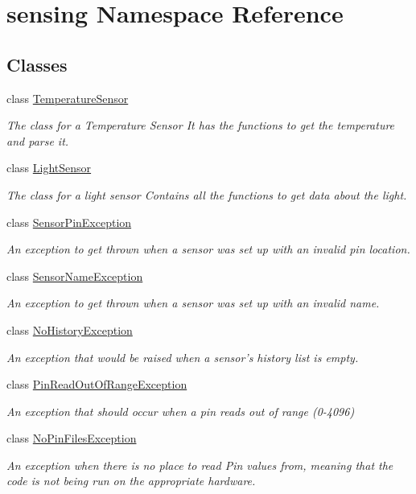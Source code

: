 \hypertarget{namespacesensing}{\section{sensing Namespace Reference}
\label{namespacesensing}
}
\subsection*{Classes}
\begin{DoxyCompactItemize}
\item 
class \hyperlink{classsensing_1_1_temperature_sensor}{Temperature\-Sensor}
\begin{DoxyCompactList}\small\item\em The class for a Temperature Sensor It has the functions to get the temperature and parse it. \end{DoxyCompactList}\item 
class \hyperlink{classsensing_1_1_light_sensor}{Light\-Sensor}
\begin{DoxyCompactList}\small\item\em The class for a light sensor Contains all the functions to get data about the light. \end{DoxyCompactList}\item 
class \hyperlink{classsensing_1_1_sensor_pin_exception}{Sensor\-Pin\-Exception}
\begin{DoxyCompactList}\small\item\em An exception to get thrown when a sensor was set up with an invalid pin location. \end{DoxyCompactList}\item 
class \hyperlink{classsensing_1_1_sensor_name_exception}{Sensor\-Name\-Exception}
\begin{DoxyCompactList}\small\item\em An exception to get thrown when a sensor was set up with an invalid name. \end{DoxyCompactList}\item 
class \hyperlink{classsensing_1_1_no_history_exception}{No\-History\-Exception}
\begin{DoxyCompactList}\small\item\em An exception that would be raised when a sensor's history list is empty. \end{DoxyCompactList}\item 
class \hyperlink{classsensing_1_1_pin_read_out_of_range_exception}{Pin\-Read\-Out\-Of\-Range\-Exception}
\begin{DoxyCompactList}\small\item\em An exception that should occur when a pin reads out of range (0-\/4096) \end{DoxyCompactList}\item 
class \hyperlink{classsensing_1_1_no_pin_files_exception}{No\-Pin\-Files\-Exception}
\begin{DoxyCompactList}\small\item\em An exception when there is no place to read Pin values from, meaning that the code is not being run on the appropriate hardware. \end{DoxyCompactList}\end{DoxyCompactItemize}
